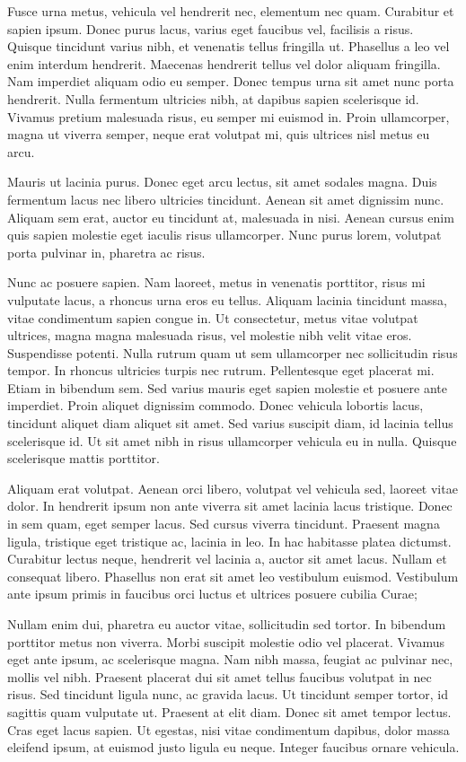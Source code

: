 \documentclass[a4paper]{article}
\begin{document}
Fusce urna metus, vehicula vel hendrerit nec, elementum nec quam. Curabitur et sapien ipsum. Donec purus lacus, varius eget faucibus vel, facilisis a risus. Quisque tincidunt varius nibh, et venenatis tellus fringilla ut. Phasellus a leo vel enim interdum hendrerit. Maecenas hendrerit tellus vel dolor aliquam fringilla. Nam imperdiet aliquam odio eu semper. Donec tempus urna sit amet nunc porta hendrerit. Nulla fermentum ultricies nibh, at dapibus sapien scelerisque id. Vivamus pretium malesuada risus, eu semper mi euismod in. Proin ullamcorper, magna ut viverra semper, neque erat volutpat mi, quis ultrices nisl metus eu arcu.

Mauris ut lacinia purus. Donec eget arcu lectus, sit amet sodales magna. Duis fermentum lacus nec libero ultricies tincidunt. Aenean sit amet dignissim nunc. Aliquam sem erat, auctor eu tincidunt at, malesuada in nisi. Aenean cursus enim quis sapien molestie eget iaculis risus ullamcorper. Nunc purus lorem, volutpat porta pulvinar in, pharetra ac risus.

Nunc ac posuere sapien. Nam laoreet, metus in venenatis porttitor, risus mi vulputate lacus, a rhoncus urna eros eu tellus. Aliquam lacinia tincidunt massa, vitae condimentum sapien congue in. Ut consectetur, metus vitae volutpat ultrices, magna magna malesuada risus, vel molestie nibh velit vitae eros. Suspendisse potenti. Nulla rutrum quam ut sem ullamcorper nec sollicitudin risus tempor. In rhoncus ultricies turpis nec rutrum. Pellentesque eget placerat mi. Etiam in bibendum sem. Sed varius mauris eget sapien molestie et posuere ante imperdiet. Proin aliquet dignissim commodo. Donec vehicula lobortis lacus, tincidunt aliquet diam aliquet sit amet. Sed varius suscipit diam, id lacinia tellus scelerisque id. Ut sit amet nibh in risus ullamcorper vehicula eu in nulla. Quisque scelerisque mattis porttitor.

Aliquam erat volutpat. Aenean orci libero, volutpat vel vehicula sed, laoreet vitae dolor. In hendrerit ipsum non ante viverra sit amet lacinia lacus tristique. Donec in sem quam, eget semper lacus. Sed cursus viverra tincidunt. Praesent magna ligula, tristique eget tristique ac, lacinia in leo. In hac habitasse platea dictumst. Curabitur lectus neque, hendrerit vel lacinia a, auctor sit amet lacus. Nullam et consequat libero. Phasellus non erat sit amet leo vestibulum euismod. Vestibulum ante ipsum primis in faucibus orci luctus et ultrices posuere cubilia Curae;

Nullam enim dui, pharetra eu auctor vitae, sollicitudin sed tortor. In bibendum porttitor metus non viverra. Morbi suscipit molestie odio vel placerat. Vivamus eget ante ipsum, ac scelerisque magna. Nam nibh massa, feugiat ac pulvinar nec, mollis vel nibh. Praesent placerat dui sit amet tellus faucibus volutpat in nec risus. Sed tincidunt ligula nunc, ac gravida lacus. Ut tincidunt semper tortor, id sagittis quam vulputate ut. Praesent at elit diam. Donec sit amet tempor lectus. Cras eget lacus sapien. Ut egestas, nisi vitae condimentum dapibus, dolor massa eleifend ipsum, at euismod justo ligula eu neque. Integer faucibus ornare vehicula.
\end{document}
